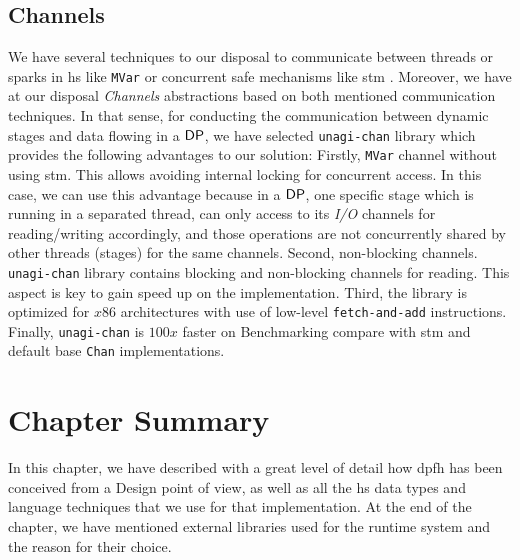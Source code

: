 \subsection{Channels\label{section:channels}} 
We have several techniques to our disposal to communicate between threads or sparks in \acrshort{hs} like \texttt{MVar} or concurrent safe mechanisms like \acrfull{stm} \cite{stm}. Moreover, we have at our disposal \textit{Channels} abstractions based on both mentioned communication techniques. In that sense, for conducting the communication between dynamic stages and data flowing in a $\mathsf{DP}$, we have selected \texttt{unagi-chan} library \cite{unagi} which provides the following advantages to our solution: Firstly,  \texttt{MVar} channel without using \acrshort{stm}. This allows avoiding internal locking for concurrent access. 
In this case, we can use this advantage because in a $\mathsf{DP}$, one specific stage which is running in a separated thread, can only access to its \textit{I/O} channels for reading/writing accordingly, and those operations are not concurrently shared by other threads (stages) for the same channels. Second,  non-blocking channels. \texttt{unagi-chan} library contains blocking and non-blocking channels for reading. This aspect is key to gain speed up on the implementation. Third, the library is optimized for $x86$ architectures with use of low-level \texttt{fetch-and-add} instructions. Finally, \texttt{unagi-chan} is $100x$ faster on Benchmarking compare with \acrshort{stm} and default base \texttt{Chan} implementations.

\section{Chapter Summary}
In this chapter, we have described with a great level of detail how \acrlong{dpfh} has been conceived from a Design point of view, 
as well as all the \acrshort{hs} data types and language techniques that we use for that implementation. 
At the end of the chapter, we have mentioned external libraries used for the runtime system and the reason for their choice.
